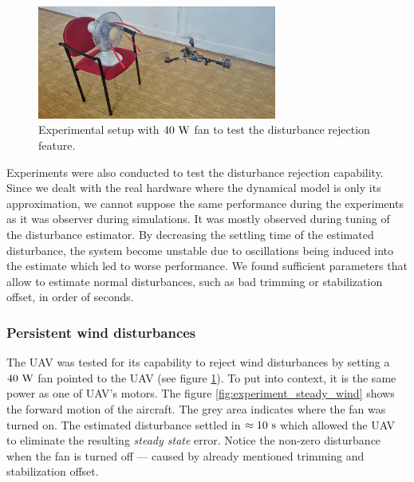 \begin{figure}[b]
\centering
\includegraphics[width=0.7\textwidth]{fig/disturbance.jpg}
\caption{Experimental setup with $40~\mathrm{W}$ fan to test the disturbance rejection feature.}
\label{fig:vetrak1}
\end{figure}

Experiments were also conducted to test the disturbance rejection capability. Since we dealt with the real hardware where the dynamical model is only its approximation, we cannot suppose the same performance during the experiments as it was observer during simulations. It was mostly observed during tuning of the disturbance estimator. By decreasing the settling time of the estimated disturbance, the system become unstable due to oscillations being induced into the estimate which led to worse performance. We found sufficient parameters that allow to estimate normal disturbances, such as bad trimming or stabilization offset, in order of seconds. 
 
\subsubsection{Persistent wind disturbances}
\label{cap:persistant_wind_disturbances_experiment}

The UAV was tested for its capability to reject wind disturbances by setting a $40~\mathrm{W}$ fan pointed to the UAV (see figure \ref{fig:vetrak1}). To put into context, it is the same power as one of UAV's motors. The figure \ref{fig:experiment_steady_wind} shows the forward motion of the aircraft. The grey area indicates where the fan was turned on. The estimated disturbance settled in $\approx 10~\mathrm{s}$ which allowed the UAV to eliminate the resulting \emph{steady state} error. Notice the non-zero disturbance when the fan is turned off --- caused by already mentioned trimming and stabilization offset.

